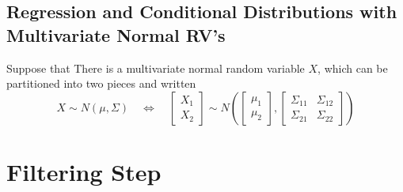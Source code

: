 \documentclass[a4paper,12pt]{article}
\begin{document}
\subsection{Regression and Conditional Distributions with Multivariate Normal RV's}

Suppose that There is a multivariate normal random variable $X$, which can be partitioned into two pieces and written
\[
  X \sim N(\mu, \Sigma) \quad\Leftrightarrow\quad
  \begin{bmatrix} X_1 \\ X_2 \end{bmatrix}
  \sim 
  N\left(\begin{bmatrix} \mu_1 \\ \mu_2 \end{bmatrix},
  \begin{bmatrix} \Sigma_{11} & \Sigma_{12} \\
  \Sigma_{21} & \Sigma_{22} \end{bmatrix} 
  \right)
\]

\section{Filtering Step}
\end{document}
